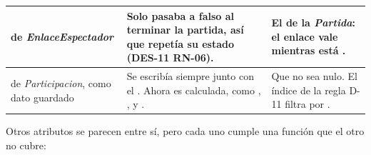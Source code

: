 \begin{center}
\begin{longtable}{|L{0.22\textwidth}|L{0.41\textwidth}|L{0.27\textwidth}|}
 de \textit{EnlaceEspectador} & Solo pasaba a falso al terminar la partida, así que repetía su estado (\mbox{DES-11} \mbox{RN-06}). & El  de la \textit{Partida}: el enlace vale mientras está . \\ \hline
{} de \textit{Participacion}, como dato guardado & Se escribía siempre junto con el . Ahora es calculada, como , ,  y . & Que  no sea nulo. El índice de la regla \mbox{D-11} filtra por . \\ \hline
\end{longtable}
\end{center}

Otros atributos se parecen entre sí, pero cada uno cumple una función que el otro no cubre:

